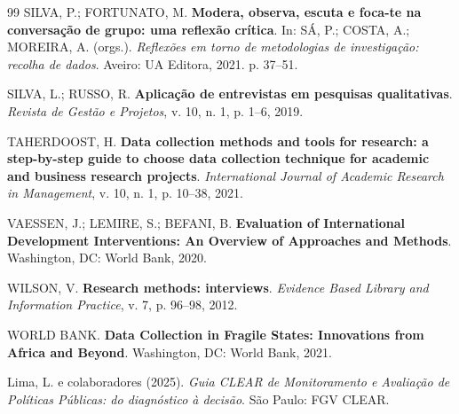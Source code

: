 \documentclass[12pt, a4paper, openany]{book}
\begin{document}
\begin{thebibliography}{99}
SILVA, P.; FORTUNATO, M. \textbf{Modera, observa, escuta e foca-te na conversa\c{c}\~ao de grupo: uma reflex\~ao cr\'itica}. In: S\'A, P.; COSTA, A.; MOREIRA, A. (orgs.). \textit{Reflex\~oes em torno de metodologias de investiga\c{c}\~ao: recolha de dados}. Aveiro: UA Editora, 2021. p. 37--51.

SILVA, L.; RUSSO, R. \textbf{Aplica\c{c}\~ao de entrevistas em pesquisas qualitativas}. \textit{Revista de Gest\~ao e Projetos}, v. 10, n. 1, p. 1--6, 2019.

TAHERDOOST, H. \textbf{Data collection methods and tools for research: a step-by-step guide to choose data collection technique for academic and business research projects}. \textit{International Journal of Academic Research in Management}, v. 10, n. 1, p. 10--38, 2021.

VAESSEN, J.; LEMIRE, S.; BEFANI, B. \textbf{Evaluation of International Development Interventions: An Overview of Approaches and Methods}. Washington, DC: World Bank, 2020.

WILSON, V. \textbf{Research methods: interviews}. \textit{Evidence Based Library and Information Practice}, v. 7, p. 96--98, 2012.

WORLD BANK. \textbf{Data Collection in Fragile States: Innovations from Africa and Beyond}. Washington, DC: World Bank, 2021.

Lima, L. e colaboradores (2025). \textit{Guia CLEAR de Monitoramento e Avaliação de Políticas Públicas: do diagnóstico à decisão}. São Paulo: FGV CLEAR.

\end{thebibliography}
\end{document}
